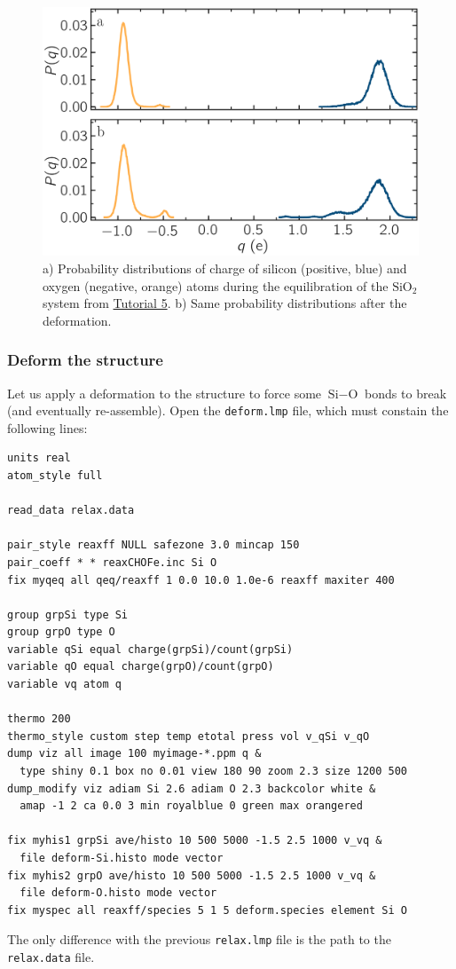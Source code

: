 \documentclass[9pt,tutorial]{livecoms}
\newcommand{\flecmd}[1]{\textcolor{command}{\texttt{#1}}} %
\begin{document}
\begin{figure}
\includegraphics[width=\linewidth]{SIO-distribution}
\caption{a) Probability distributions of charge of silicon (positive, blue) and oxygen
(negative, orange) atoms during the equilibration of the $\text{SiO}_2$ system
from \hyperref[reactive-silicon-dioxide-label]{Tutorial 5}.  b) Same probability distributions
after the deformation.}
\label{fig:SIO-distribution}
\end{figure}

\subsubsection{Deform the structure}

Let us apply a deformation to the structure to force some $\text{Si}-\text{O}$
bonds to break (and eventually re-assemble).  Open the \flecmd{deform.lmp}
file, which must constain the following lines:
\begin{lstlisting}
units real
atom_style full

read_data relax.data

pair_style reaxff NULL safezone 3.0 mincap 150
pair_coeff * * reaxCHOFe.inc Si O
fix myqeq all qeq/reaxff 1 0.0 10.0 1.0e-6 reaxff maxiter 400

group grpSi type Si
group grpO type O
variable qSi equal charge(grpSi)/count(grpSi)
variable qO equal charge(grpO)/count(grpO)
variable vq atom q

thermo 200
thermo_style custom step temp etotal press vol v_qSi v_qO
dump viz all image 100 myimage-*.ppm q &
  type shiny 0.1 box no 0.01 view 180 90 zoom 2.3 size 1200 500
dump_modify viz adiam Si 2.6 adiam O 2.3 backcolor white &
  amap -1 2 ca 0.0 3 min royalblue 0 green max orangered

fix myhis1 grpSi ave/histo 10 500 5000 -1.5 2.5 1000 v_vq &
  file deform-Si.histo mode vector
fix myhis2 grpO ave/histo 10 500 5000 -1.5 2.5 1000 v_vq &
  file deform-O.histo mode vector
fix myspec all reaxff/species 5 1 5 deform.species element Si O
\end{lstlisting}
The only difference with the previous \flecmd{relax.lmp} file is the path to
the \flecmd{relax.data} file.
\end{document}
